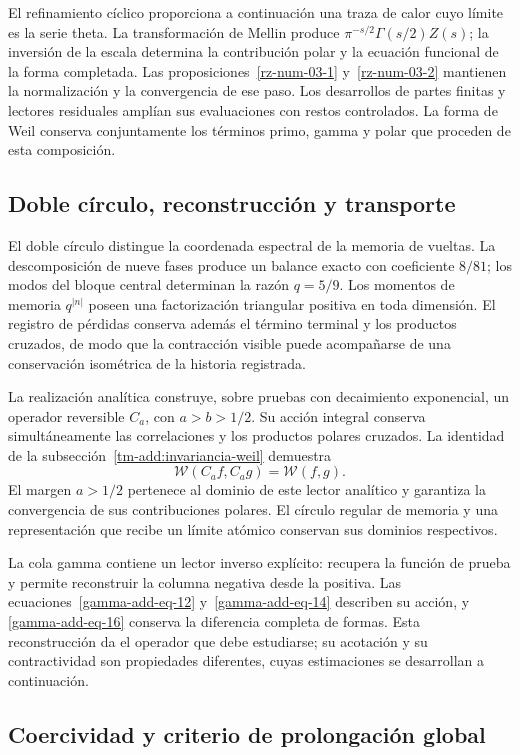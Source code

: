 El refinamiento cíclico proporciona a continuación una traza de
calor cuyo límite es la serie theta. La transformación de Mellin
produce $\pi^{-s/2}\Gamma(s/2)Z(s)$; la inversión de la escala
determina la contribución polar y la ecuación funcional de la
forma completada. Las proposiciones~\ref{rz-num-03-1}
y~\ref{rz-num-03-2} mantienen la normalización y la convergencia
de ese paso. Los desarrollos de partes finitas y lectores
residuales amplían sus evaluaciones con restos controlados.
La forma de Weil conserva conjuntamente los términos primo,
gamma y polar que proceden de esta composición.

\subsection*{Doble círculo, reconstrucción y transporte}

El doble círculo distingue la coordenada espectral de la memoria
de vueltas. La descomposición de nueve fases produce un balance
exacto con coeficiente $8/81$; los modos del bloque central
determinan la razón $q=5/9$. Los momentos de memoria
$q^{|n|}$ poseen una factorización triangular positiva en toda
dimensión. El registro de pérdidas conserva además el término
terminal y los productos cruzados, de modo que la contracción
visible puede acompañarse de una conservación isométrica de la
historia registrada.

La realización analítica construye, sobre pruebas con
decaimiento exponencial, un operador reversible $C_a$, con
$a>b>1/2$. Su acción integral conserva simultáneamente las
correlaciones y los productos polares cruzados. La identidad
de la subsección~\ref{tm-add:invariancia-weil} demuestra
\[
\mathscr W(C_af,C_ag)=\mathscr W(f,g).
\]
El margen $a>1/2$ pertenece al dominio de este lector analítico
y garantiza la convergencia de sus contribuciones polares.
El círculo regular de memoria y una representación que recibe
un límite atómico conservan sus dominios respectivos.

La cola gamma contiene un lector inverso explícito: recupera
la función de prueba y permite reconstruir la columna negativa
desde la positiva. Las ecuaciones~\eqref{gamma-add-eq-12}
y~\eqref{gamma-add-eq-14} describen su acción, y
\eqref{gamma-add-eq-16} conserva la diferencia completa de
formas. Esta reconstrucción da el operador que debe estudiarse;
su acotación y su contractividad son propiedades diferentes,
cuyas estimaciones se desarrollan a continuación.

\subsection*{Coercividad y criterio de prolongación global}

